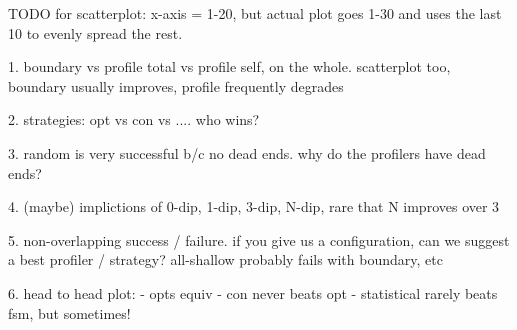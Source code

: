 
TODO for scatterplot: x-axis = 1-20, but actual plot goes 1-30 and uses the
last 10 to evenly spread the rest.

1. boundary vs profile total vs profile self, on the whole. scatterplot too,
   boundary usually improves, profile frequently degrades

2. strategies: opt vs con vs .... who wins?

3. random is very successful b/c no dead ends.
   why do the profilers have dead ends?

4. (maybe) implictions of 0-dip, 1-dip, 3-dip, N-dip,
   rare that N improves over 3

5. non-overlapping success / failure.
   if you give us a configuration, can we suggest a best profiler / strategy?
   all-shallow probably fails with boundary, etc

6. head to head plot:
   - opts equiv
   - con never beats opt
   - statistical rarely beats fsm, but sometimes!


